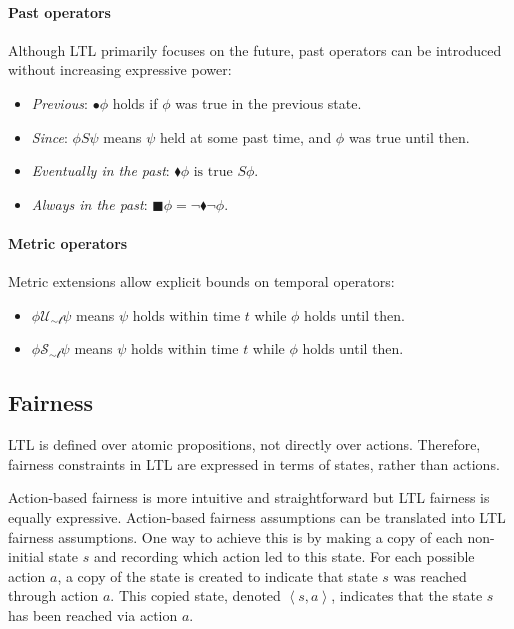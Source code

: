 \paragraph*{Past operators}
Although LTL primarily focuses on the future, past operators can be introduced without increasing expressive power:
\begin{itemize}
    \item \textit{Previous}: $\bullet\phi$ holds if $\phi$ was true in the previous state.
    \item \textit{Since}: $\phi S \psi$ means $\psi$ held at some past time, and $\phi$ was true until then.
    \item \textit{Eventually in the past}: $\blacklozenge \phi\text{ is true }S\phi$.
    \item \textit{Always in the past}: $\blacksquare \phi=\lnot\blacklozenge \lnot\phi$.
\end{itemize}

\paragraph*{Metric operators}
Metric extensions allow explicit bounds on temporal operators:
\begin{itemize}
    \item $\phi\mathcal{U_{\sim t}}\psi$ means $\psi$ holds within time $t$ while $\phi$ holds until then.
    \item $\phi\mathcal{S_{\sim t}}\psi$ means $\psi$ holds within time $t$ while $\phi$ holds until then.
\end{itemize}

\subsection{Fairness}
LTL is defined over atomic propositions, not directly over actions.
Therefore, fairness constraints in LTL are expressed in terms of states, rather than actions.

Action-based fairness is more intuitive and straightforward but LTL fairness is equally expressive.
Action-based fairness assumptions can be translated into LTL fairness assumptions.
One way to achieve this is by making a copy of each non-initial state $s$ and recording which action led to this state. 
For each possible action $a$, a copy of the state is created to indicate that state $s$ was reached through action $a$. 
This copied state, denoted $\left\langle s,a\right\rangle$, indicates that the state $s$ has been reached via action $a$.

